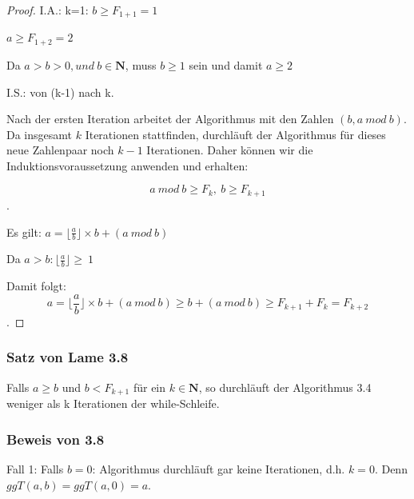 \documentclass[12pt]{article}
\begin{document}
\begin{algorithm}
\begin{proof}
\noindent I.A.: k=1: $ b \geq F_{1+1}= 1$


  \indent $a \geq F_{1+2}= 2$

\noindent  Da $a > b > 0, und  \ b \in \mathbf{N}$, muss $b \geq 1$ sein und damit $a \geq 2$






\vspace{0.4cm}
\noindent I.S.: von (k-1) nach k.
\vspace{0.15cm}

\noindent Nach der ersten Iteration arbeitet der Algorithmus mit den Zahlen $(b, a \ mod \ b)$. Da insgesamt $k $ Iterationen stattfinden, durchläuft der Algorithmus für dieses neue Zahlenpaar noch $k−1$ Iterationen. Daher können wir die Induktionsvoraussetzung anwenden und erhalten: 




\vspace{0.3cm}

$$a \ mod \ b \geq F_{k}, \ b \geq F_{k+1}$$.

\vspace{0.15cm}

Es gilt: $a= \lfloor \frac{a}{b} \rfloor \times b + (a \ mod \ b)$

\vspace{0.15cm}
Da $a > b: \lfloor \frac{a}{b} \rfloor \geq \ 1$ 

\vspace{0.3cm}
\noindent Damit folgt: $$a= \lfloor \frac{a}{b} \rfloor \times b + (a \ mod \ b)
\geq b+ (a \ mod  \ b) \geq F_{k+1} + F_{k}= F_{k+2}$$.


\end{proof}

\vspace{1cm}
\subsubsection*{Satz von Lame 3.8}
Falls $a \geq b$ und $b < F_{k+1}$ für ein $k \in \mathbf{N}$, so durchläuft der Algorithmus 3.4 weniger als k Iterationen der while-Schleife.

\vspace{1cm}
\subsubsection*{Beweis von 3.8}

Fall 1: Falls $ b= 0$: Algorithmus durchläuft gar keine Iterationen, d.h. $k=0$. Denn $ggT(a,b)= ggT(a,0)= a$.


\end{algorithm}
\end{document}
